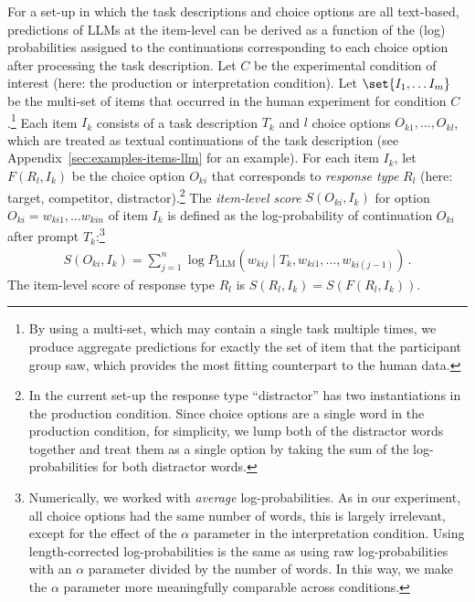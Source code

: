 \documentclass[fleqn]{article}
\begin{document}
For a set-up in which the task descriptions and choice options are all text-based, predictions of LLMs at the item-level can be derived as a function of the (log) probabilities assigned to the continuations corresponding to each choice option after processing the task description.
Let $C$ be the experimental condition of interest (here: the production or interpretation condition).
Let \(\set{I_1, \dots I_m}\) be the multi-set of items that occurred in the human experiment for condition $C$.\footnote{
  By using a multi-set, which may contain a single task multiple times, we produce aggregate predictions for exactly the set of item that the participant group saw, which provides the most fitting counterpart to the human data.
}
Each item $I_{k}$ consists of a task description $T_{k}$ and $l$ choice options $O_{k1}, \dots, O_{kl}$, which are treated as textual continuations of the task description (see Appendix~\ref{sec:examples-items-llm} for an example).
For each item $I_{k}$, let $F(R_{l}, I_{k})$ be the choice option $O_{ki}$ that corresponds to \emph{response type} $R_{l}$ (here: target, competitor, distractor).\footnote{In the current set-up the response type ``distractor'' has two instantiations in the production condition. Since choice options are a single word in the production condition, for simplicity, we lump both of the distractor words together and treat them as a single option by taking the sum of the log-probabilities for both distractor words.}
The \emph{item-level score} $S(O_{{ki}}, I_{k})$ for option $O_{ki} = w_{ki1}, \dots w_{kin}$ of item $I_{k}$ is defined as the log-probability of continuation $O_{ki}$ after prompt $T_{k}$:\footnote{Numerically, we worked with \emph{average} log-probabilities. As in our experiment, all choice options had the same number of words, this is largely irrelevant, except for the effect of the $\alpha$ parameter in the interpretation condition. Using length-corrected log-probabilities is the same as using raw log-probabilities with an $\alpha$ parameter divided by the number of words. In this way, we make the $\alpha$ parameter more meaningfully comparable across conditions.}
%
\begin{align*}
S(O_{ki}, I_{k}) =  \sum_{j=1}^n \log P_{\text{LLM}} \left(w_{kij} \mid T_{k}, w_{ki1}, \dots, w_{ki(j-1)} \right)  \,.
\end{align*}
%
The item-level score of response type $R_{l}$ is $S(R_{l}, I_{k}) = S(F(R_{l}, I_{k}))$.
\end{document}
